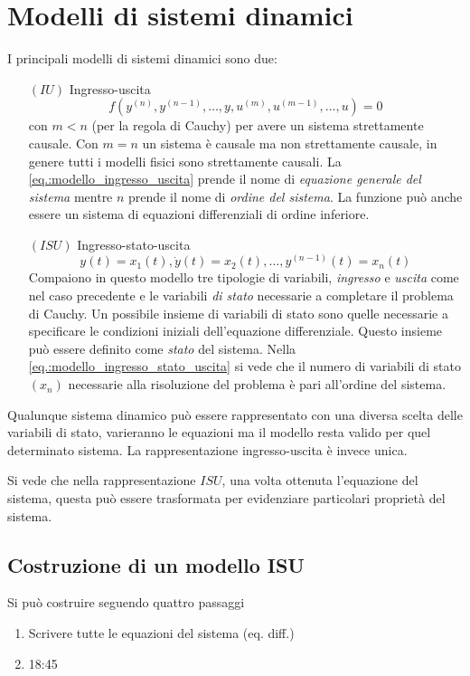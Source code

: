 \chapter{Modelli di sistemi dinamici}
I principali modelli di sistemi dinamici sono due:
\begin{itemize}
\item [$(IU)$]Ingresso-uscita
\begin{equation}
f\left(y^{(n)},y^{(n-1)},\dots,y,u^{(m)},u^{(m-1)},\dots,u\right)=0
\label{eq.:modello_ingresso_uscita}
\end{equation}
con $m<n$ (per la regola di Cauchy) per avere un sistema strettamente causale. Con $m=n$ un sistema
è causale ma non strettamente causale, in genere tutti i modelli fisici sono strettamente causali.
La \ref{eq.:modello_ingresso_uscita} prende il nome di \textit{equazione generale del sistema}
mentre $n$
prende il nome di \textit{ordine del sistema}.
La funzione può anche essere un sistema di equazioni differenziali di ordine inferiore.
\item[$(ISU)$] Ingresso-stato-uscita
\begin{equation}
y(t) = x_1(t), \dot{y}(t) = x_2(t),\dots,y^{(n-1)}(t)=x_n(t)
\label{eq.:modello_ingresso_stato_uscita}
\end{equation}
Compaiono in questo modello tre tipologie di variabili, \textit{ingresso} e \textit{uscita} come nel
caso precedente e le variabili \textit{di stato} necessarie a completare il problema di Cauchy.
Un possibile insieme di variabili di stato sono quelle necessarie a specificare le condizioni
iniziali dell'equazione differenziale. Questo insieme può essere definito come \textit{stato} del
sistema.
Nella \ref{eq.:modello_ingresso_stato_uscita} si vede che il numero di variabili di stato $(x_n)$
necessarie alla risoluzione del problema è pari all'ordine del sistema.
\end{itemize}

Qualunque sistema dinamico può essere rappresentato con una diversa scelta delle variabili di
stato, varieranno le equazioni ma il modello resta valido per quel determinato sistema. La
rappresentazione ingresso-uscita è invece unica.

Si vede che nella rappresentazione $ISU$, una volta ottenuta l'equazione del sistema, questa può
essere trasformata per evidenziare particolari proprietà del sistema.

\newpage
\section{Costruzione di un modello ISU}
Si può costruire seguendo quattro passaggi
\begin{enumerate}
\item Scrivere tutte le equazioni del sistema (eq. diff.)
\item 18:45
\end{enumerate}
